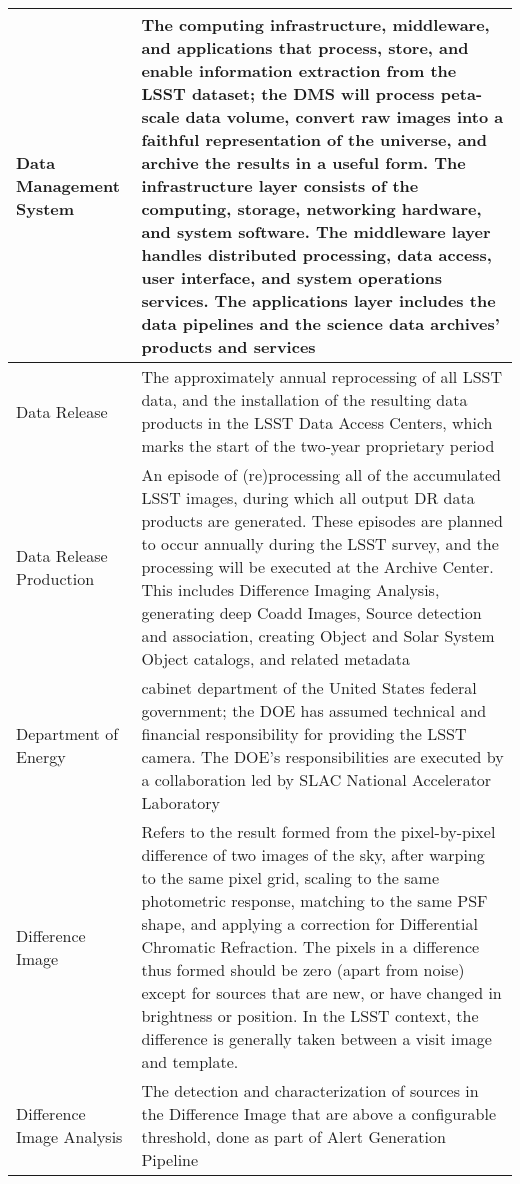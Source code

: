 \begin{longtable}{|p{}|p{}|}
Data Management System & The computing infrastructure, middleware, and applications that process, store, and enable information extraction from the \gls{LSST} dataset; the \gls{DMS} will process peta-scale data volume, convert raw images into a faithful representation of the universe, and archive the results in a useful form. The infrastructure layer consists of the computing, storage, networking hardware, and system software. The middleware layer handles distributed processing, data access, user interface, and system operations services. The applications layer includes the data pipelines and the science data archives' products and services \\\hline
Data Release & The approximately annual reprocessing of all \gls{LSST} data, and the installation of the resulting data products in the \gls{LSST} Data Access Centers, which marks the start of the two-year proprietary period \\\hline
Data Release Production & An episode of (re)processing all of the accumulated \gls{LSST} images, during which all output \gls{DR} data products are generated. These episodes are planned to occur annually during the \gls{LSST} survey, and the processing will be executed at the \gls{Archive} \gls{Center}. This includes Difference Imaging Analysis, generating deep Coadd Images, \gls{Source} detection and association, creating \gls{Object} and Solar System \gls{Object} catalogs, and related \gls{metadata} \\\hline
Department of Energy & cabinet department of the United States federal government; the \gls{DOE} has assumed technical and financial responsibility for providing the \gls{LSST} \gls{camera}. The \gls{DOE}'s responsibilities are executed by a collaboration led by \gls{SLAC} National Accelerator Laboratory \\\hline
Difference Image & Refers to the result formed from the pixel-by-pixel difference of two images of the sky, after warping to the same pixel grid, scaling to the same photometric response, matching to the same \gls{PSF} \gls{shape}, and applying a correction for \gls{Differential Chromatic Refraction}. The pixels in a difference thus formed should be zero (apart from noise) except for sources that are new, or have changed in brightness or position. In the \gls{LSST} context, the difference is generally taken between a visit image and template.  \\\hline
Difference Image Analysis & The detection and characterization of sources in the \gls{Difference Image} that are above a configurable threshold, done as part of \gls{Alert} Generation Pipeline \\\hline

\end{longtable}
